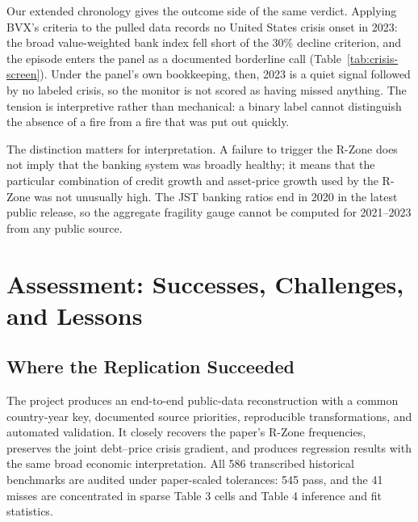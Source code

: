 \documentclass[11pt]{article}
\begin{document}
Our extended chronology gives the outcome side of the same verdict.
Applying BVX's criteria to the pulled data records no United States crisis
onset in 2023: the broad value-weighted bank index fell short of the 30\%
decline criterion, and the episode enters the panel as a documented
borderline call (Table~\ref{tab:crisis-screen}). Under the panel's own
bookkeeping, then, 2023 is a quiet signal followed by no labeled crisis, so
the monitor is not scored as having missed anything. The tension is
interpretive rather than mechanical: a binary label cannot distinguish the
absence of a fire from a fire that was put out quickly.

The distinction matters for interpretation. A failure to trigger the R-Zone
does not imply that the banking system was broadly healthy; it means that
the particular combination of credit growth and asset-price growth used by
the R-Zone was not unusually high. The JST banking ratios end in 2020 in
the latest public release, so the aggregate fragility gauge cannot be
computed for 2021--2023 from any public source.

\begin{table}[htbp]
\centering
\caption{\textbf{United States predictor case study, 2019--2023.} Three-year
business and household debt growth and real asset-price growth never jointly
cross their historical thresholds. The R-Zone therefore does not signal the
2023 banking stress, illustrating the distinction between a broad
borrower-side boom and concentrated bank-level funding, duration, and run
risk.}
\label{tab:usa-case}
\small

\end{table}

\section{Assessment: Successes, Challenges, and Lessons}

\subsection*{Where the Replication Succeeded}

The project produces an end-to-end public-data reconstruction with a common
country-year key, documented source priorities, reproducible
transformations, and automated validation. It closely recovers the paper's
R-Zone frequencies, preserves the joint debt--price crisis gradient, and
produces regression results with the same broad economic interpretation. All
586 transcribed historical benchmarks are audited under paper-scaled
tolerances: 545 pass, and the 41 misses are concentrated in sparse Table 3
cells and Table 4 inference and fit statistics.
\end{document}
